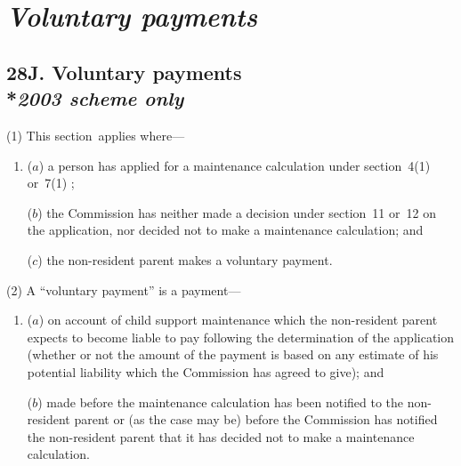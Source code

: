 \documentclass[12pt,a4paper]{article}
\begin{document}


\section{\itshape Voluntary payments}

\subsection[28J. Voluntary payments --- \emph{2003 scheme only}]{28J. Voluntary payments\\*\emph{2003 scheme only}}

(1) This section~applies where—
\begin{enumerate}\item[]
($a$) a person has applied for a maintenance calculation under section~4(1)  or~7(1)%
;

($b$) the 
Commission  %
has neither made a decision under section~11 or~12 on the application, nor decided not to make a maintenance calculation; and

($c$) the non-resident parent makes a voluntary payment.
\end{enumerate}

(2) A “voluntary payment” is a payment—
\begin{enumerate}\item[]
($a$) on account of child support maintenance which the non-resident parent expects to become liable to pay following the determination of the application (whether or not the amount of the payment is based on any estimate of his potential liability which the 
Commission  %
has agreed to give); and

($b$) made before the maintenance calculation has been notified to the non-resident parent or (as the case may be) before the 
Commission  %
has notified the non-resident parent that 
it  %
has decided not to make a maintenance calculation.
\end{enumerate}
\end{document}
